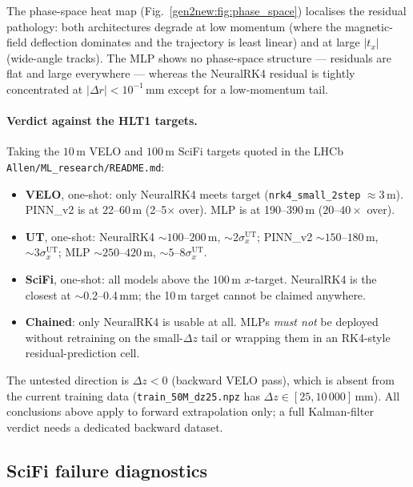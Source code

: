 \documentclass[a4paper,11pt]{article}
\begin{document}
The phase-space heat map (Fig.~\ref{gen2new:fig:phase_space})
localises the residual pathology: both architectures degrade at low
momentum (where the magnetic-field deflection dominates and the
trajectory is least linear) and at large $|t_x|$ (wide-angle
tracks). The MLP shows no phase-space structure --- residuals are
flat and large everywhere --- whereas the NeuralRK4 residual is
tightly concentrated at $|\Delta r|<10^{-1}$\,mm except for a
low-momentum tail.

\paragraph{Verdict against the HLT1 targets.} Taking the
$10$\,\textmu m VELO and $100$\,\textmu m SciFi targets quoted in
the LHCb \texttt{Allen/ML\_research/README.md}:
\begin{itemize}
  \item \textbf{VELO}, one-shot: only NeuralRK4 meets target
        (\texttt{nrk4\_small\_2step} $\approx 3$\,\textmu m).
        PINN\_v2 is at 22--60\,\textmu m (2--5$\times$ over).
        MLP is at 190--390\,\textmu m ($20$--$40\times$ over).
  \item \textbf{UT}, one-shot: NeuralRK4 $\sim\!100$--$200$\,\textmu m,
        $\sim\!2\sigma_x^{\mathrm{UT}}$; PINN\_v2 $\sim\!150$--$180$\,\textmu m,
        $\sim\!3\sigma_x^{\mathrm{UT}}$; MLP $\sim\!250$--$420$\,\textmu m,
        $\sim\!5$--$8\sigma_x^{\mathrm{UT}}$.
  \item \textbf{SciFi}, one-shot: all models above the
        $100$\,\textmu m $x$-target.  NeuralRK4 is the closest at
        $\sim$0.2--0.4\,mm; the 10\,\textmu m target cannot be
        claimed anywhere.
  \item \textbf{Chained}: only NeuralRK4 is usable at all. MLPs
        \emph{must not} be deployed without retraining on the
        small-$\Delta z$ tail or wrapping them in an RK4-style
        residual-prediction cell.
\end{itemize}
The untested direction is $\Delta z<0$ (backward VELO pass), which
is absent from the current training data
(\texttt{train\_50M\_dz25.npz} has $\Delta z\in[25,10\,000]$\,mm).
All conclusions above apply to forward extrapolation only; a full
Kalman-filter verdict needs a dedicated backward dataset.

\subsection{SciFi failure diagnostics}\label{gen2new:sec:scifi_failure}
\end{document}
